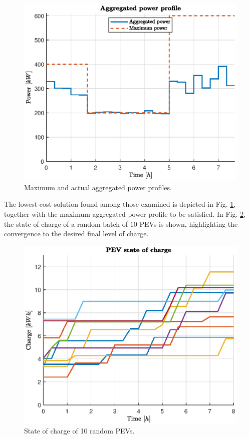 \begin{figure}[H]
    \centering
    \includegraphics[width=0.9\columnwidth]{assets/aggregated.eps}
    \caption{Maximum and actual aggregated power profiles. }
    \label{fig:aggregated}
\end{figure}

\noindent The lowest-cost solution found among those examined is depicted in Fig. \ref{fig:aggregated}, together with the maximum aggregated power profile to be satisfied. In Fig. \ref{fig:soc}, the state of charge of a random batch of $10$ PEVs is shown, highlighting the convergence to the desired final level of charge.

\begin{figure}[H]
    \centering
    \includegraphics[width=0.9\columnwidth]{assets/state_of_charge.eps}
    \caption{State of charge of 10 random PEVs. }
    \label{fig:soc}
\end{figure}

